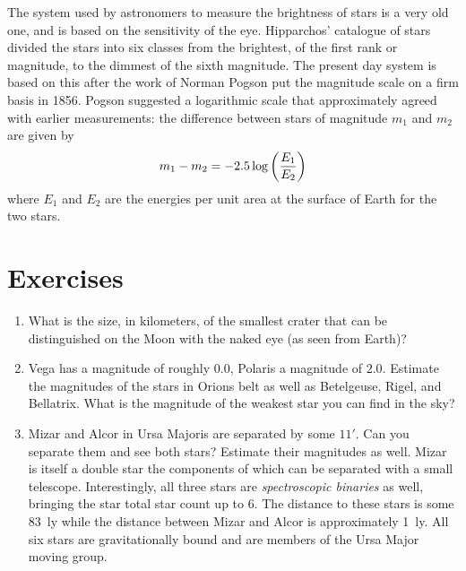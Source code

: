 The system used by astronomers to measure the brightness of stars is a
very old one, and is based on the sensitivity of the eye. Hipparchos'
catalogue of stars divided the stars into six classes from the
brightest, of the first rank or magnitude, to the dimmest of the sixth
magnitude. The present day system is based on this after the work of
Norman Pogson put the magnitude scale on a firm basis in 1856. Pogson
suggested a logarithmic scale that approximately agreed with earlier
measurements: the difference between stars of magnitude $m_1$ and
$m_2$ are given by 
\[
m_1-m_2=-2.5\log\left({E_1\over E_2}\right)
\]
where $E_1$ and $E_2$ are the energies per unit area at the surface of
Earth for the two stars.

\section{Exercises}

\begin{enumerate}
\item What is the size, in kilometers, of the smallest crater that can be distinguished on 
the Moon with the naked eye (as seen from Earth)?
\item Vega has a magnitude of roughly $0.0$, Polaris a magnitude of $2.0$. 
Estimate the magnitudes of the stars in Orions belt as well as Betelgeuse,
Rigel, and Bellatrix. What is the magnitude of the weakest star you can find
in the sky? 
\item Mizar and Alcor in Ursa Majoris are separated by some $11'$.
 Can you separate them and see both stars? Estimate their magnitudes
 as well. Mizar is itself a double star the components of which can be
 separated with a small telescope. Interestingly, all three stars are
 {\it spectroscopic binaries} as well, bringing the star total star
 count up to 6. The distance to these stars is some 83~ly while the
 distance between Mizar and Alcor is approximately
 1~ly. All six stars are  gravitationally bound and are
 members of the Ursa Major moving group.
\end{enumerate}
